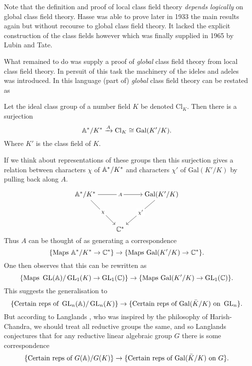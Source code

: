 Note that the definition and proof of local class field theory \textit{depends logically } on global class field theory. Hasse was able to prove later in 1933 the main results again but without recourse to global class field theory. It lacked the explicit construction of the class fields however which was finally supplied in 1965 by Lubin and Tate.

What remained to do was supply a proof of \textit{global} class field theory from local class field theory. In persuit of this task the machinery of the ideles and adeles was introduced. In this language (part of) \textit{global} class field theory can be restated as 
\begin{Theorem}
	Let the ideal class group of a number field \(K\) be denoted \(\mathrm{Cl}_K\). Then there is a surjection
	\[ \A^*/ K^* \xrightarrow{A} \mathrm{Cl}_K \cong \mathrm{Gal}(K'/K).\]
	Where \(K'\) is the class field of \(K\).
\end{Theorem}
If we think about representations of these groups then this surjection gives a relation between characters \(\chi\) of \(\A^*/K^*\) and characters \(\chi'\) of \(\mathrm{Gal}(K'/K)\) by pulling back along \(A\).

\[\begin{tikzcd}[cramped]
	{\A^*/K^*} && {\mathrm{Gal}(K'/K)} \\
	\\
	& {\C^*}
	\arrow["A"{description}, from=1-1, to=1-3]
	\arrow["\chi"{description}, from=1-1, to=3-2]
	\arrow["{\chi'}"{description}, from=1-3, to=3-2]
\end{tikzcd}\]
Thus \(A\) can be thought of as generating a correspondence
\[\{\text{Maps }\A^*/K^*\to \C^*\} \to\{ \text{Maps }\mathrm{Gal}(K'/K)\to \C^*\}. \]
One then observes that this can be rewritten as 
\[\{\text{Maps }\GL(\A)/\GL_1(K)\to \GL_1(\C)\} \to\{ \text{Maps }\mathrm{Gal}(K'/K)\to \GL_1(\C)\} .\]
This suggests the generalisation to 
\[\{\text{Certain reps of }\GL_n(\A)/\GL_n(K)\} \to\{ \text{Certain reps of  }\mathrm{Gal}(\bar{K}/K)\text{ on } \GL_n\}   .\]
But according to Langlands \cite{langlandsREPRESENTATIONTHEORYITS}, who was inspired by the philosophy of Harish-Chandra, we should treat all reductive groups the same, and so Langlands conjectures that for any reductive linear algebraic group \(G\) there is some correspondence
\[\{\text{Certain reps of }G(\A)/G(K)\} \to\{ \text{Certain reps of  }\mathrm{Gal}(\bar{K}/K)\text{ on } G\} .\]


